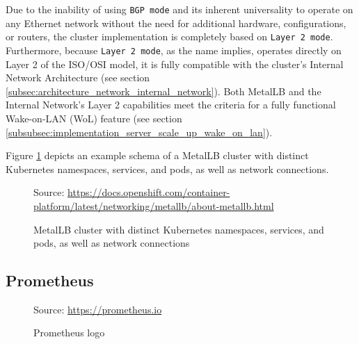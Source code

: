 Due to the inability of using \texttt{BGP mode} and its inherent universality to
operate on any Ethernet network without the need for additional hardware,
configurations, or routers, the cluster implementation is completely based on
\texttt{Layer 2 mode}. Furthermore, because \texttt{Layer 2 mode}, as the name implies,
operates directly on Layer 2 of the ISO/OSI model, it is fully compatible with the
cluster's Internal Network Architecture (see section
\ref{subsec:architecture_network_internal_network}). Both MetalLB and the
Internal Network's Layer 2 capabilities meet the criteria for a fully functional
Wake-on-LAN (WoL) feature (see section \ref{subsubsec:implementation_server_scale_up_wake_on_lan}).

Figure \ref{fig:metallb} depicts an example schema of a MetalLB cluster with
distinct Kubernetes namespaces, services, and pods, as well as network connections.

\begin{figure}[htbp]
  \centering
  \def\stackalignment{r} %
  {\scriptsize Source: \url{https://docs.openshift.com/container-platform/latest/networking/metallb/about-metallb.html} }
  \caption{MetalLB
  cluster
  with
  distinct
  Kubernetes
  namespaces,
  services,
  and
  pods,
  as
  well
  as
  network
  connections}
  \label{fig:metallb}
\end{figure}

\subsection{Prometheus}
\label{subsec:implementation_dependencies_prometheus}

\begin{figure} %
  \centering
  \def\stackalignment{l} %
  {\scriptsize \parbox[t]{\linewidth}{ Source: \url{https://prometheus.io}} }
  \caption{Prometheus logo}
\end{figure}


